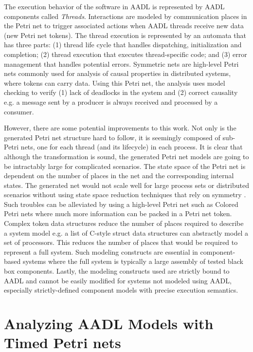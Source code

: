 The execution behavior of the software in AADL is represented by AADL components called \emph{Threads}. Interactions are modeled by communication places in the Petri net to trigger associated actions when AADL threads receive new data (new Petri net tokens). The thread execution is represented by an automata that has three parts: (1) thread life cycle that handles dispatching, initialization and completion; (2) thread execution that executes thread-specific code; and (3) error management that handles potential errors. Symmetric nets are high-level Petri nets commonly used for analysis of causal properties in distributed systems, where tokens can carry data. Using this Petri net, the analysis uses model checking to verify (1) lack of deadlocks in the system and (2) correct causality e.g. a message sent by a producer is always received and processed by a consumer. 

However, there are some potential improvements to this work. Not only is the generated Petri net structure hard to follow, it is seemingly composed of sub-Petri nets, one for each thread (and its lifecycle) in each process. It is clear that although the transformation is sound, the generated Petri net models are going to be intractably large for complicated scenarios. The state space of the Petri net is dependent on the number of places in the net and the corresponding internal states. The generated net would not scale well for large process sets or distributed scenarios without using state space reduction techniques that rely on symmetry \cite{sistla2004symmetry}. Such troubles can be alleviated by using a high-level Petri net such as Colored Petri nets where much more information can be packed in a Petri net token. Complex token data structures reduce the number of places required to describe a system model e.g. a list of C-style struct data structures can abstractly model a set of processors. This reduces the number of places that would be required to represent a full system. Such modeling constructs are essential in component-based systems where the full system is typically a large assembly of tested black box components. Lastly, the modeling constructs used are strictly bound to AADL and cannot be easily modified for systems not modeled using AADL, especially strictly-defined component models with precise execution semantics. 

\section{Analyzing AADL Models with Timed Petri nets}

